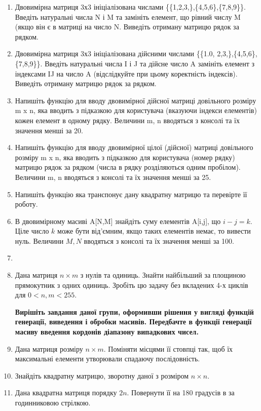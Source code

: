 \documentclass[]{article}
\begin{document}
\begin{enumerate}

\item
  Двовимірна матриця 3х3 ініціалізована числами
  \{\{1,2,3,\},\{4,5,6\},\{7,8,9\}\}. Введіть
  натуральні числа N і M та замініть елемент, що рівний числу M (якщо
  він є в матриці на число N. Виведіть отриману матрицю рядок за
  рядком.
\item
  Двовимірна матриця 3х3 ініціалізована дійсними числами \{\{1.0,
  2,3,\},\{4,5,6\},\{7,8,9\}\}. Введіть
  натуральні числа I і J та дійсне число A замініть елемент з індексами
  IJ на число A (відслідкуйте при цьому коректність індексів). Виведіть
  отриману матрицю рядок за рядком.
\item
  Напишіть функцію для вводу двовимірної дійсної матриці довільного
  розміру m x n, яка вводить з підказкою для користувача (вказуючи
  індекси елементів) кожен елемент в одному рядку. Величини m, n
  вводяться з консолі та їх значення менші за 20.
\item
  Напишіть функцію для вводу двовимірної цілої (дійсної) матриці
  довільного розміру m x n, яка вводить з підказкою для користувача
  (номер рядку) матрицю рядок за рядком (числа в рядку розділяються
  одним пробілом). Величини m, n вводяться з консолі та їх значення
  менші за 25.
\item
 Напишіть функцію яка транспонує дану квадратну матрицю та перевірте її
роботу.
\item
  В двовимірному масиві A{[}N,M{]} знайдіть суму елементів A{[}i,j{]},
  що $i-j=k$. Ціле число $k$ може бути від'ємним, якщо таких елементів
  немає, то вивести нуль. Величини $M, N$ вводяться з консолі та їх
  значення менші за 100.
\item
\item
  Дана матриця $n \times m$ з нулів та одиниць. Знайти найбільший за площиною
  прямокутник з одних одиниць. Зробіть цю задачу без вкладених 4-х
  циклів для $0<n,m<255$.

\textbf{Вирішіть завдання даної групи, оформивши рішення у вигляді
функцій генерації, виведення і обробки масивів. Передбачте в функції
генерації масиву введення кордонів діапазону випадкових чисел.}

\item
  Дана матриця розміру $n \times m$. Поміняти місцями її стовпці так, щоб їх
  максимальні елементи утворювали спадаючу послідовність.
\item
  Знайдіть квадратну матрицю, зворотну даної з розміром $n \times n$.
\item
  Дана квадратна матриця порядку $2n$. Повернути її на 180 градусів в
  за годинниковою стрілкою.


\end{enumerate}
\end{document}
